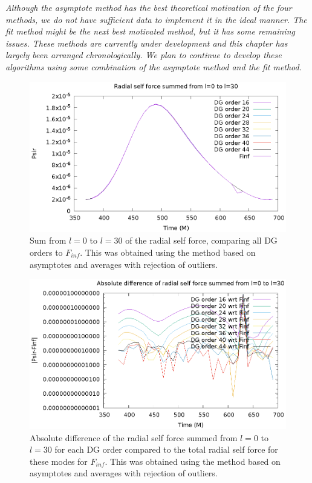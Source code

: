 {\em Although the asymptote method has the best theoretical motivation of the four methods, we do not have sufficient data to implement it in the ideal manner. The fit method might be the next best motivated method, but it has some remaining issues. These methods are currently under development and this chapter has largely been arranged chronologically. We plan to continue to develop these algorithms using some combination of the asymptote method and the fit method.}

\begin{figure}
\includegraphics{psirvtwfinfdgorders}
\caption{Sum from $l=0$ to $l=30$ of the radial self force, comparing all DG orders to $F_{inf}$. This was obtained using the method based on asymptotes and averages with rejection of outliers.}
\label{summixed}
\end{figure}

\begin{figure}
\includegraphics{absdiffpsirvtwfinfdgorders}
\caption{Absolute difference of the radial self force summed from $l=0$ to $l=30$  for each DG order compared to the total radial self force for these modes for $F_{inf}$. This was obtained using the method based on asymptotes and averages with rejection of outliers.}
\label{absmixed}
\end{figure}

